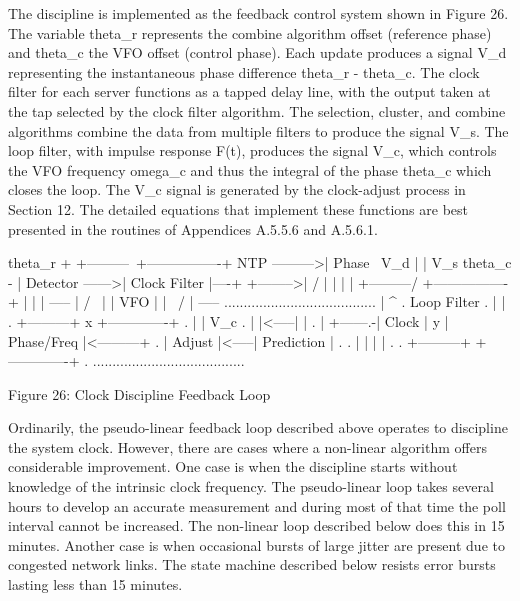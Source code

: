 The discipline is implemented as the feedback control system shown in
Figure 26.  The variable theta_r represents the combine algorithm
offset (reference phase) and theta_c the VFO offset (control phase).
Each update produces a signal V_d representing the instantaneous
phase difference theta_r - theta_c.  The clock filter for each server
functions as a tapped delay line, with the output taken at the tap
selected by the clock filter algorithm.  The selection, cluster, and
combine algorithms combine the data from multiple filters to produce
the signal V_s.  The loop filter, with impulse response F(t),
produces the signal V_c, which controls the VFO frequency omega_c and
thus the integral of the phase theta_c which closes the loop.  The
V_c signal is generated by the clock-adjust process in Section 12.
The detailed equations that implement these functions are best
presented in the routines of Appendices A.5.5.6 and A.5.6.1.

              theta_r + +---------\        +----------------+
        NTP --------->|  Phase   \  V_d  |                | V_s
            theta_c - | Detector  ------>|  Clock Filter  |----+
            +-------->|          /       |                |    |
            |         +---------/        +----------------+    |
            |                                                  |
          -----                                                |
          /     \                                               |
          | VFO |                                               |
          \     /                                               |
          -----    .......................................     |
            ^      .            Loop Filter              .     |
            |      . +---------+   x  +-------------+    .     |
            | V_c  . |         |<-----|             |    .     |
            +------.-|  Clock  |   y  | Phase/Freq  |<---------+
                    . | Adjust  |<-----| Prediction  |    .
                    . |         |      |             |    .
                    . +---------+      +-------------+    .
                    .......................................

              Figure 26: Clock Discipline Feedback Loop

Ordinarily, the pseudo-linear feedback loop described above operates
to discipline the system clock.  However, there are cases where a
non-linear algorithm offers considerable improvement.  One case is
when the discipline starts without knowledge of the intrinsic clock
frequency.  The pseudo-linear loop takes several hours to develop an
accurate measurement and during most of that time the poll interval
cannot be increased.  The non-linear loop described below does this
in 15 minutes.  Another case is when occasional bursts of large
jitter are present due to congested network links.  The state machine
described below resists error bursts lasting less than 15 minutes.

